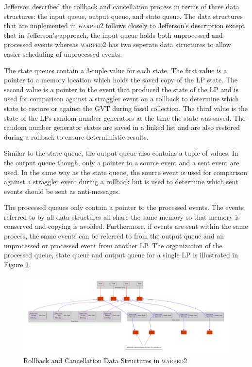 \documentclass[11pt]{book}
\begin{document}
Jefferson \cite{jefferson-85} described the rollback and cancellation process in terms of three data
structures: the input queue, output queue, and state queue.  The data structures that are
implemented in \textsc{warped2} follows closely to Jefferson's description except that in
Jefferson's approach, the input queue holds both unprocessed and processed events whereas
\textsc{warped2} has two seperate data structures to allow easier scheduling of unprocessed events.

The state queues contain a 3-tuple value for each state.  The first value is a pointer to a memory
location which holds the saved copy of the LP state.  The second value is a pointer to the event
that produced the state of the LP and is used for comparison against a straggler event on a rollback
to determine which state to restore or against the GVT during fossil collection.  The third value is
the state of the LPs random number generators at the time the state was saved.  The random number
generator states are saved in a linked list and are also restored during a rollback to ensure
deterministic results.

Similar to the state queue, the output queue also contains a tuple of values.  In the output queue
though, only a pointer to a source event and a sent event are used.  In the same way as the state
queue, the source event is used for comparison against a straggler event during a rollback but is
used to determine which sent events should be sent as anti-messages.

The processed queues only contain a pointer to the processed events.  The events referred to by all
data structures all share the same memory so that memory is conserved and copying is avoided.
Furthermore, if events are sent within the same process, the same events can be referred to from the
output queue and an unprocessed or processed event from another LP.  The organization of the
processed queue, state queue and output queue for a single LP is illustrated in Figure
\ref{rollback_ds}.

\begin{figure}
    \centering
    \includegraphics[width=\textwidth,quiet]{figs/graphviz/rollback_ds.pdf}
    \caption{Rollback and Cancellation Data Structures in \textsc{warped2}}\label{rollback_ds}
\end{figure}
\end{document}
